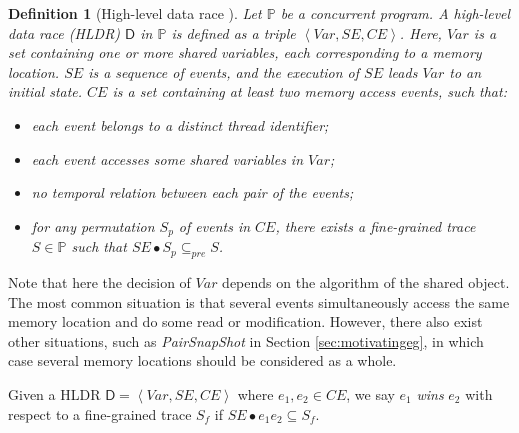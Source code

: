 \documentclass[runningheads]{llncs}
\newcommand{\p}{\mathbb{P} }
\newcommand{\se}{\mathit{SE}}
\newcommand{\ce}{\mathit{CE}}
\newtheorem{myDef}{Definition}
\begin{document}
\begin{myDef}[High-level data race \cite{DBLP:journals/stvr/ArthoHB03}]\label{def:datarace}
Let $\p$ be a concurrent program. 
A \textit{high-level data race} (\textit{HLDR}) $\mathsf{D}$ in $\mathbb{P}$ is defined as a triple $\left\langle \mathit{Var}, \mathit{SE}, \mathit{CE}\right\rangle$. 
Here, $\mathit{Var}$ is a set containing one or more shared variables, each corresponding to a memory location. $\mathit{SE}$ is a sequence of events, 
and the execution of $\mathit{SE}$ leads $\mathit{Var}$ to an initial state.
$\mathit{CE}$ is a set containing at least two memory access events, such that:

\begin{itemize}
\item each event belongs to a distinct thread identifier;
\item each event accesses some shared variables in $\mathit{Var}$;
\item no temporal relation between each pair of the events;
\item for any permutation $S_p$ of events in $\ce$, there exists a fine-grained trace $S\in \p$ such that $\se \bullet S_p \subseteq_{pre} S$.
\end{itemize}




\end{myDef}

Note that here the decision of $\mathit{Var}$ depends on the algorithm of the shared object. The most common situation is that several events 
simultaneously access the same memory location and do some read or modification. 
However, there also exist other situations, such as \textit{PairSnapShot} in Section \ref{sec:motivatingeg}, in which case several memory locations should be considered as a whole.

Given a HLDR $\mathsf{D}  = \left\langle \mathit{Var}, \mathit{SE}, \mathit{CE}\right\rangle$ where $e_1, e_2\in \mathit{CE}$, we say $e_1$ \textit{wins} $e_2$ with respect to a fine-grained trace $S_f$ if 
 $\mathit{SE}\bullet e_1e_2 \subseteq S_f $.
 
\end{document}
